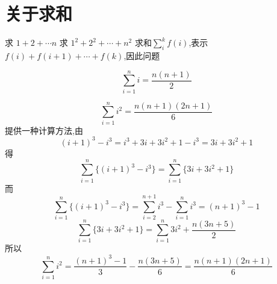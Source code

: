\documentclass[12pt,answers]{exam}
\begin{document}
\section*{关于求和}
\begin{questions}
\question 求 $1+2+\cdots n$ 
\question 求 $1^2+2^2+\cdots+n^2$
\question 求和$\sum_{i}^{k} f(i)$,表示 $f(i)+f(i+1)+\cdots +f(k)$,因此问题
\begin{solution}
\[\sum_{i=1}^{n} i=\frac{n(n+1)}{2}\]
\end{solution}
\begin{solution}
\[\sum_{i=1}^{n} i^2=\frac{n(n+1)(2n+1)}{6}\]
提供一种计算方法,由
\[ (i+1)^3-i^3 =i^3+3i+3i^2+1-i^3=3i+3i^2+1\]
得
\[\sum_{i=1}^{n} \{(i+1)^3-i^3\}=\sum_{i=1}^{n}\{3i+3i^2+1\}\]
而 \[\sum_{i=1}^{n}\{(i+1)^3-i^3\} =\sum_{i=2}^{n+1}i^3 -\sum_{i=1}^{n}i^3=(n+1)^3-1 \]
\[\sum_{i=1}^{n} \{3i+3i^2+1\} =\sum_{i=1}^{n}3i^2+\frac{n(3n+5)}{2}\]
所以 \[\sum_{i=1}^{n}i^2 = \frac{(n+1)^3-1}{3} -\frac{n(3n+5)}{6}=\frac{n(n+1)(2n+1)}{6}\]
\end{solution}
\end{questions}
\end{document}
